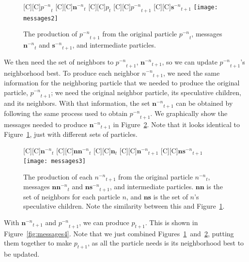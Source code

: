 \documentclass[journal,letterpaper]{IEEEtran}
\newcommand{\fig}[1]{Figure~\ref{fig:#1}}
\providecommand{\nonbest}[1]{\ensuremath{#1^{-n}}}
\providecommand{\p}{\ensuremath{p}}
\providecommand{\sset}{\ensuremath{\mathbf{s}}}
\providecommand{\nsset}{\ensuremath{\mathbf{ns}}}
\providecommand{\n}{\ensuremath{n}}
\providecommand{\nset}{\ensuremath{\mathbf{n}}}
\providecommand{\nnset}{\ensuremath{\mathbf{nn}}}
\begin{document}
\begin{figure}
  \centering
  [C][C]{$\nonbest{\p}_{t}$}
  [C][C]{$\nonbest{\nset}_{t}$}
  [C][C]{$\p_{t}$}
  [C][C]{$\nonbest{\p}_{t+1}$}
  [C][C]{$\nonbest{\sset}_{t+1}$}
  \texttt{[image: messages2]}
  \caption{The production of $\nonbest{\p}_{t+1}$ from the original particle 
  $\nonbest{\p}_{t}$, messages $\nonbest{\nset}_{t}$ and
  $\nonbest{\sset}_{t+1}$, and intermediate particles.}
  \label{fig:messages2}
\end{figure}

We then need the set of neighbors to $\nonbest{\p}_{t+1}$,
$\nonbest{\nset}_{t+1}$, so we can update $\nonbest{\p}_{t+1}$'s neighborhood
best.  To produce each neighbor $\nonbest{\n}_{t+1}$, we need the same
information for the neighboring particle that we needed to produce the original
particle, $\nonbest{\p}_{t+1}$; we need the original neighbor particle, its
speculative children, and its neighbors.  With that information, the set
$\nonbest{\nset}_{t+1}$ can be obtained by following the same process used to
obtain $\nonbest{\p}_{t+1}$.  We graphically show the messages needed to
produce $\nonbest{\nset}_{t+1}$ in \fig{messages3}.  Note that it looks
identical to \fig{messages2}, just with different sets of particles.

\begin{figure}
  \centering
  [C][C]{$\nonbest{\nset}_{t}$}
  [C][C]{$\nonbest{\nnset}_{t}$}
  [C][C]{$\nset_{t}$}
  [C][C]{$\nonbest{\nset}_{t+1}$}
  [C][C]{$\nonbest{\nsset}_{t+1}$}
  \texttt{[image: messages3]}
  \caption{The production of each $\nonbest{\n}_{t+1}$ from the original
  particle $\nonbest{\n}_{t}$, messages $\nonbest{\nnset}_{t}$ and
  $\nonbest{\nsset}_{t+1}$, and intermediate particles.  $\nnset$ is the set of
  neighbors for each particle $\n$, and $\nsset$ is the set of $\n$'s
  speculative children.  Note the similarity between this and \fig{messages2}.}
  \label{fig:messages3}
\end{figure}

With $\nonbest{\nset}_{t+1}$ and $\nonbest{\p}_{t+1}$, we can produce
$\p_{t+1}$.  This is shown in \fig{messages4}.  Note that we just combined
Figures~\ref{fig:messages2}~and~\ref{fig:messages3}, putting them together
to make $\p_{t+1}$, as all the particle needs is its neighborhood best to be
updated.
\end{document}
